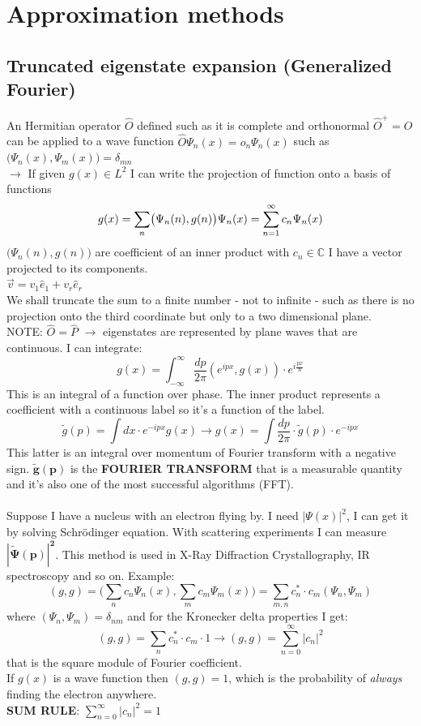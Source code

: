 \graphicspath{{chapters/05/}}
\chapter{Approximation methods}

\section{Truncated eigenstate expansion (Generalized Fourier)}
An Hermitian operator $\hat{O}$ defined such as it is complete and orthonormal $\hat{O}^+=\hat{O}$ can be applied to a wave function $\hat{O}\Psi_n(x)=o_n\Psi_n(x)$ such as $\bigl(\Psi_n(x),\Psi_m(x)\bigr)=\delta_{mn}$\\
$\rightarrow$ If given $g(x)\in L^2$ I can write the projection of function onto a basis of functions\\
\[
g(x)=\sum_{n}\bigl(\Psi_n(n),g(n)\bigr)\Psi_n(x) =\sum_{n=1}^{\infty}c_n\Psi_n(x)\\
\]
$\bigl(\Psi_n(n),g(n)\bigr)$ are coefficient of an inner product with $c_n\in \mathbb{C}$
I have a vector projected to its components.\\
$\vec v = v_1\hat{e}_1+v_r\hat{e}_r$\\
We shall truncate the sum to a finite number - not to infinite - such as there is no projection onto the third coordinate but only to a two dimensional plane.\\
NOTE: $\hat{O}=\hat{P}$ $\rightarrow$ eigenstates are represented by plane waves that are continuous. I can integrate:\\
\[
g(x)=\int_{-\infty}^{\infty}\frac{dp}{2\pi}(e^{ipx},g(x))\cdot e^{i\frac{px}{\hbar}}
\]
This is an integral of a function over phase. The inner product represents a coefficient with a continuous label so it's a function of the label.
\[
\tilde{g}(p)=\int dx\cdot e^{-ipx}g(x) \rightarrow g(x)=\int \frac{dp}{2\pi} \cdot \tilde{g}(p) \cdot e^{-ipx}
\]
This latter is an integral over momentum of Fourier transform with a negative sign.
$\mathbf{\tilde{g}(p)}$ is the \textbf{FOURIER TRANSFORM} that is a measurable quantity and it's also one of the most successful algorithms (FFT).\\
\\
Suppose I have a nucleus with an electron flying by. I need $|\Psi(x)|^2$, I can get it by solving Schr{\"o}dinger equation. With scattering experiments I can measure $\mathbf{|\tilde{\Psi}(p)|^2}$. This method is used in X-Ray Diffraction Crystallography, IR spectroscopy and so on.
\newline
Example:
\[
(g,g)=\biggl(\sum_nc_n\Psi_n(x), \sum_mc_m\Psi_m(x)\biggr) = \sum_{m,n}c_n^*\cdot c_m(\Psi_n, \Psi_m)
\]
where $(\Psi_n,\Psi_m)=\delta_{nm}$ and for the Kronecker delta properties I get:
\[
(g,g)= \sum_nc_n^* \cdot c_m \cdot 1 \rightarrow (g,g)=\sum_{n=0}^{\infty}|c_n|^2
\]
that is the square module of Fourier coefficient.\\
If $g(x)$ is a wave function then $(g,g)=1$, which is the probability of \emph{always} finding the electron anywhere.\\
\newline
\textbf{SUM RULE}: $\sum_{n=0}^{\infty}|c_n|^2=1$

